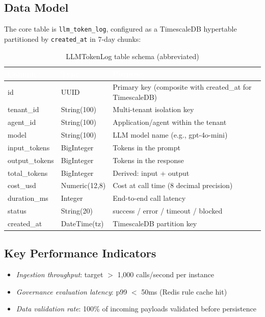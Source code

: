 \documentclass[12pt,a4paper,twoside]{report}
\newcommand{\kpi}[1]{\textit{\textcolor{accentgreen}{#1}}}
\begin{document}
\subsection{Data Model}

The core table is \texttt{llm\_token\_log}, configured as a TimescaleDB hypertable partitioned by \texttt{created\_at} in 7-day chunks:

\begin{table}[H]
\centering
\small
\begin{tabularx}{\textwidth}{|l|l|X|}
\hline
\rowcolor{tabheader}
\textcolor{white}{\textbf{Column}} &
\textcolor{white}{\textbf{Type}} &
\textcolor{white}{\textbf{Purpose}} \\
\hline
id & UUID & Primary key (composite with created\_at for TimescaleDB) \\
\hline
tenant\_id & String(100) & Multi-tenant isolation key \\
\hline
agent\_id & String(100) & Application/agent within the tenant \\
\hline
model & String(100) & LLM model name (e.g., gpt-4o-mini) \\
\hline
input\_tokens & BigInteger & Tokens in the prompt \\
\hline
output\_tokens & BigInteger & Tokens in the response \\
\hline
total\_tokens & BigInteger & Derived: input + output \\
\hline
cost\_usd & Numeric(12,8) & Cost at call time (8 decimal precision) \\
\hline
duration\_ms & Integer & End-to-end call latency \\
\hline
status & String(20) & success / error / timeout / blocked \\
\hline
created\_at & DateTime(tz) & TimescaleDB partition key \\
\hline
\end{tabularx}
\caption{LLMTokenLog table schema (abbreviated)}
\end{table}

\subsection{Key Performance Indicators}
\begin{itemize}
  \item \kpi{Ingestion throughput}: target $>$ 1,000 calls/second per instance
  \item \kpi{Governance evaluation latency}: p99 $<$ 50ms (Redis rule cache hit)
  \item \kpi{Data validation rate}: 100\% of incoming payloads validated before persistence
\end{itemize}
\end{document}
